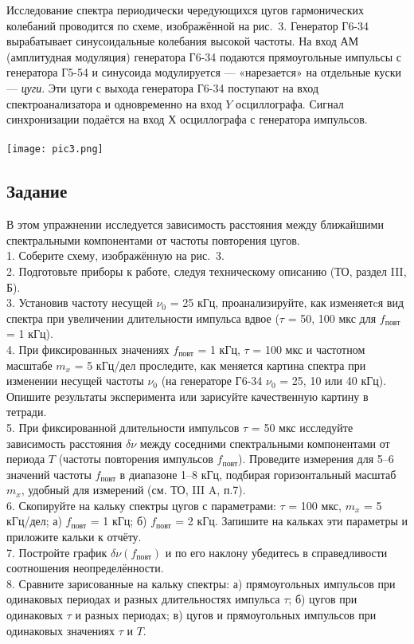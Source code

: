 Исследование спектра периодически
чередующихся цугов гармонических
колебаний проводится по схеме,
изображённой на рис.~3.
Генератор Г6-34 вырабатывает синусоидальные
колебания высокой частоты. На вход АМ (амплитудная модуляция) генератора Г6-34 подаются прямоугольные импульсы с генератора Г5-54 и синусоида модулируется
— «нарезается» на отдельные куски — \textit{цуги}. Эти цуги с выхода генератора Г6-34 поступают на вход спектроанализатора и одновременно на вход $Y$ осциллографа. Сигнал синхронизации подаётся на вход $Х$ осциллографа с генератора импульсов.\\
\\
\texttt{[image: pic3.png]}

\subsection{\label{sec:level2}Задание}

В этом упражнении исследуется зависимость расстояния между ближайшими спектральными
компонентами от частоты повторения цугов.\\
1. Соберите схему, изображённую на рис.~3.\\
2. Подготовьте приборы к работе, следуя техническому описанию (ТО, раздел III, Б).\\
3. Установив частоту несущей $\nu_0$ = 25 кГц, проанализируйте, как изменяетcя вид спектра при увеличении длительности импульса вдвое ($\tau$ = 50, 100 мкс для
$f_{\text{повт}}$ = 1 кГц).\\
4. При фиксированных значениях $f_{\text{повт}}$ = 1 кГц, $\tau$ = 100 мкс и частотном масштабе $m_x$ = 5 кГц/дел проследите,
как меняется картина спектра при изменении несущей частоты $\nu_0$ (на генераторе Г6-34 $\nu_0$ = 25, 10 или 40 кГц). Опишите результаты эксперимента или зарисуйте качественную картину в тетради.\\
5. При фиксированной длительности импульсов $\tau$ = 50 мкс исследуйте зависимость расстояния $\delta{\nu}$ между соседними спектральными компонентами от периода
$T$ (частоты повторения импульсов
$f_{\text{повт}}$). Проведите измерения для 5–6 значений частоты
$f_{\text{повт}}$ в диапазоне 1–8 кГц, подбирая горизонтальный масштаб $m_x$, удобный для измерений (см. ТО, III A, п.7).\\
6. Скопируйте на кальку спектры цугов с параметрами: $\tau$ = 100 мкс, $m_x$ = 5 кГц/дел; а) $f_{\text{повт}}$ = 1 кГц; б) $f_{\text{повт}}$ = 2 кГц.
Запишите на кальках эти параметры и приложите кальки к отчёту.\\
7. Постройте график $\delta{\nu}(f_{\text{повт}})$ и по его наклону убедитесь в справедливости соотношения неопределённости.\\
8. Сравните зарисованные на кальку спектры: а) прямоугольных импульсов при одинаковых периодах и разных длительностях импульса $\tau$; б) цугов при одинаковых $\tau$ и разных периодах; в) цугов и прямоугольных импульсов при одинаковых значениях $\tau$ и $T$.

